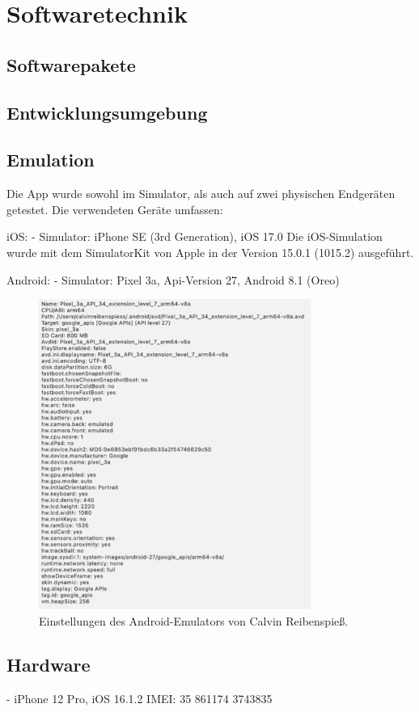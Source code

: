 
\chapter{Softwaretechnik}

\section{Softwarepakete}

\section{Entwicklungsumgebung}

\section{Emulation}

Die App wurde sowohl im Simulator, als auch auf zwei physischen Endgeräten getestet.
Die verwendeten Geräte umfassen:

iOS:
-	Simulator: iPhone SE (3rd Generation), iOS 17.0
Die iOS-Simulation wurde mit dem SimulatorKit von Apple in der Version 15.0.1 (1015.2) ausgeführt.

Android:
-	Simulator: Pixel 3a, Api-Version 27, Android 8.1 (Oreo)

\begin{figure}[H]
    \centering
    \includegraphics[width=0.8\textwidth]{images/android_emulator_reibenspiess.png}
    \caption{Einstellungen des Android-Emulators von Calvin Reibenspieß.}
    \label{branding}
  \end{figure}

\section{Hardware}

-	iPhone 12 Pro, iOS 16.1.2
IMEI: 35 861174 3743835